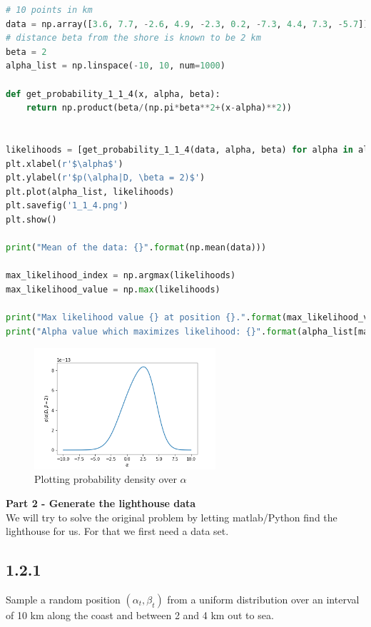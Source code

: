 \documentclass[a4paper]{article}
\begin{document}
\begin{lstlisting}[language=Python]
# 10 points in km
data = np.array([3.6, 7.7, -2.6, 4.9, -2.3, 0.2, -7.3, 4.4, 7.3, -5.7])
# distance beta from the shore is known to be 2 km
beta = 2
alpha_list = np.linspace(-10, 10, num=1000)

def get_probability_1_1_4(x, alpha, beta):
    return np.product(beta/(np.pi*beta**2+(x-alpha)**2))


likelihoods = [get_probability_1_1_4(data, alpha, beta) for alpha in alpha_list]
plt.xlabel(r'$\alpha$')
plt.ylabel(r'$p(\alpha|D, \beta = 2)$')
plt.plot(alpha_list, likelihoods)
plt.savefig('1_1_4.png')
plt.show()

print("Mean of the data: {}".format(np.mean(data)))

max_likelihood_index = np.argmax(likelihoods)
max_likelihood_value = np.max(likelihoods)

print("Max likelihood value {} at position {}.".format(max_likelihood_value, max_likelihood_index))
print("Alpha value which maximizes likelihood: {}".format(alpha_list[max_likelihood_index]))
\end{lstlisting}

\begin{figure}[H]
\center
\includegraphics[width=0.6\textwidth]{Images/1_1_4.png}
\caption{Plotting probability density over $\alpha$}
\label{fig:114}
\end{figure}

\textbf{Part 2 - Generate the lighthouse data}\\


We will try to solve the original problem by letting matlab/Python find the lighthouse for us. For that we first need a data set.

\subsection*{1.2.1}

Sample a random position $(\alpha_t, \beta_t)$ from a uniform distribution over an interval of 10 km along the coast and between 2 and 4 km out to sea.\\
\end{document}
